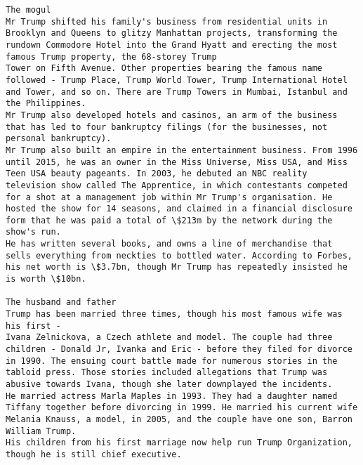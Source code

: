 \begin{lstlisting}
The mogul 
Mr Trump shifted his family's business from residential units in Brooklyn and Queens to glitzy Manhattan projects, transforming the rundown Commodore Hotel into the Grand Hyatt and erecting the most famous Trump property, the 68-storey Trump 
Tower on Fifth Avenue. Other properties bearing the famous name followed - Trump Place, Trump World Tower, Trump International Hotel and Tower, and so on. There are Trump Towers in Mumbai, Istanbul and the Philippines. 
Mr Trump also developed hotels and casinos, an arm of the business that has led to four bankruptcy filings (for the businesses, not personal bankruptcy). 
Mr Trump also built an empire in the entertainment business. From 1996 until 2015, he was an owner in the Miss Universe, Miss USA, and Miss Teen USA beauty pageants. In 2003, he debuted an NBC reality television show called The Apprentice, in which contestants competed for a shot at a management job within Mr Trump's organisation. He hosted the show for 14 seasons, and claimed in a financial disclosure form that he was paid a total of \$213m by the network during the show's run. 
He has written several books, and owns a line of merchandise that sells everything from neckties to bottled water. According to Forbes, his net worth is \$3.7bn, though Mr Trump has repeatedly insisted he is worth \$10bn. 
 
The husband and father 
Trump has been married three times, though his most famous wife was his first - 
Ivana Zelnickova, a Czech athlete and model. The couple had three children - Donald Jr, Ivanka and Eric - before they filed for divorce in 1990. The ensuing court battle made for numerous stories in the tabloid press. Those stories included allegations that Trump was abusive towards Ivana, though she later downplayed the incidents. 
He married actress Marla Maples in 1993. They had a daughter named Tiffany together before divorcing in 1999. He married his current wife Melania Knauss, a model, in 2005, and the couple have one son, Barron William Trump. 
His children from his first marriage now help run Trump Organization, though he is still chief executive. 
 

\end{lstlisting}
